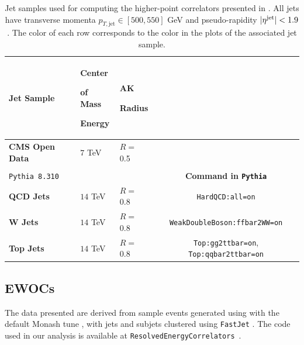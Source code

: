 \begin{subappendices}
\begin{table}[t]
    \vspace{10pt}
    \centering
    \begin{tabular}{>{\centering\arraybackslash}p{1.9cm}p{1.6cm}p{1.8cm}c@{}}
        \toprule
    \textbf{Jet Sample} & \textbf{Center} \par \textbf{of Mass} \par \textbf{Energy} & \textbf{AK} \par \textbf{Radius}
        \\
        \midrule
        \rowcolor{orange!85!purple!40}
        \textbf{CMS Open Data} & \(7\) TeV & \(R=\,\)0.5
        \\
        \\
        \midrule
        \texttt{Pythia 8.310} & & & \textbf{Command in \texttt{Pythia}}\\
        \midrule
        \rowcolor{blue!50!green!15}
        \textbf{QCD Jets} & \(14\) TeV & \(R=\,\)0.8 & \texttt{HardQCD:all=on} \\
        \midrule
        \rowcolor{pink!50}
        \textbf{\(\boldsymbol{W}\) Jets} & \(14\) TeV & \(R=\,\)0.8 & \texttt{WeakDoubleBoson:ffbar2WW=on} \\
        \midrule
        \rowcolor{yellow!40}
        \textbf{Top Jets} & \(14\) TeV & \(R=\,\)0.8 & \texttt{Top:gg2ttbar=on}, \texttt{Top:qqbar2ttbar=on} \\
        \bottomrule
    \end{tabular}
    \caption[Jet samples used for computing higher-point energy correlators in this thesis.]{Jet samples used for computing the higher-point correlators presented in .
    All jets %
    have transverse momenta $p_{T,\text{jet}} \in [500, 550]$ GeV and pseudo-rapidity $\vert \eta^{\rm jet} \vert < 1.9$.
    The color of each row corresponds to the color in the plots of the associated jet sample.
    \label{tab:samples}
    }
\end{table}


\subsection{EWOCs}
The data presented  are derived from sample events generated using \pythia{} \cite{Bierlich:2022pfr} with the default Monash tune \cite{Skands:2014pea}, with jets and subjets clustered using \texttt{FastJet} \cite{Cacciari:2011ma}.
%
The code used in our analysis is available at \texttt{ResolvedEnergyCorrelators}~\cite{Alipour-fard:2024szj,github:RENC}.


\end{subappendices}
